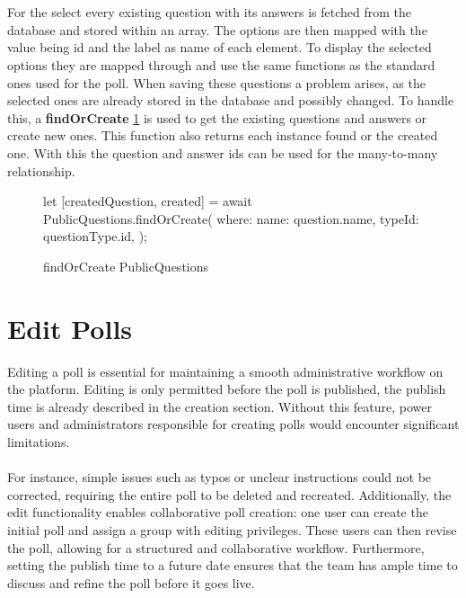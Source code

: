 \documentclass[a4paper,12pt]{report}
\begin{document}
\\ \\
For the select every existing question with its answers is fetched from the database and stored within an array. The options are then mapped with the value being id and the label as name of each element. To display the selected options they are mapped through and use the same functions as the standard ones used for the poll. When saving these questions a problem arises, as the selected ones are already stored in the database and possibly changed. To handle this, a \textbf{findOrCreate} \ref{fig:publicQuestions} is used to get the existing questions and answers or create new ones. This function also returns each instance found or the created one. With this the question and answer ids can be used for the many-to-many relationship. \parencite{sequelizedoku} 
\begin{figure}[h!]
\begin{code}
let [createdQuestion, created] = await PublicQuestions.findOrCreate({
	where: {
		name: question.name,
		typeId: questionType.id,
	}
});
\end{code}
	\caption{findOrCreate PublicQuestions}
	\label{fig:publicQuestions}
\end{figure}

\section{Edit Polls}
Editing a poll is essential for maintaining a smooth administrative workflow on the platform. Editing is only permitted before the poll is published, the publish time is already described in the creation section. Without this feature, power users and administrators responsible for creating polls would encounter significant limitations. \\ \\
For instance, simple issues such as typos or unclear instructions could not be corrected, requiring the entire poll to be deleted and recreated. Additionally, the edit functionality enables collaborative poll creation: one user can create the initial poll and assign a group with editing privileges. These users can then revise the poll, allowing for a structured and collaborative workflow. Furthermore, setting the publish time to a future date ensures that the team has ample time to discuss and refine the poll before it goes live. \\
\end{document}
